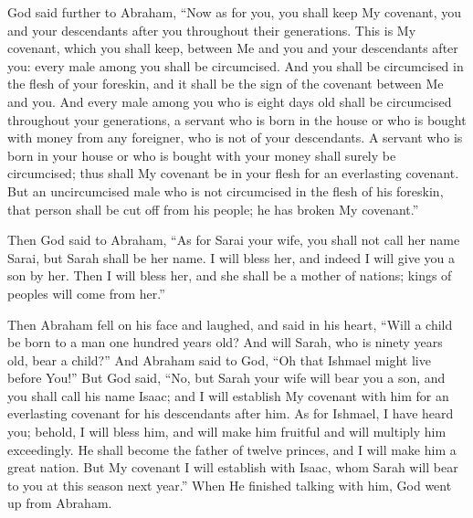 \begin{scripture}[Genesis 17:9-22]
    God said further to Abraham,  
     “Now as for you, you shall keep My covenant, you and your descendants after you throughout their generations.
    This is My covenant, which you shall keep, between Me and you and your descendants after you: every male among you shall be circumcised.
    And you shall be circumcised in the flesh of your foreskin, and it shall be the sign of the covenant between Me and you.
    And every male among you who is eight days old shall be circumcised throughout your generations, a servant who is born in the house or who is bought with money from any foreigner, who is not of your descendants.
    A servant who is born in your house or who is bought with your money shall surely be circumcised; thus shall My covenant be in your flesh for an everlasting covenant.
    But an uncircumcised male who is not circumcised in the flesh of his foreskin, that person shall be cut off from his people; he has broken My covenant.”

    \vspace{1\baselineskip}

    Then God said to Abraham, “As for Sarai your wife, you shall not call her name Sarai, but Sarah shall be her name. 
    I will bless her, and indeed I will give you a son by her. Then I will bless her, and she shall be a mother of nations; kings of peoples will come from her.”

    \vspace{1\baselineskip}

    Then Abraham fell on his face and laughed, 
    and said in his heart, “Will a child be born to a man one hundred years old? And will Sarah, who is ninety years old, bear a child?”
    And Abraham said to God, “Oh that Ishmael might live before You!”
    But God said, “No, but Sarah your wife will bear you a son, and you shall call his name Isaac; and I will establish My covenant with him for an everlasting covenant for his descendants after him.
    As for Ishmael, I have heard you; behold, I will bless him, and will make him fruitful and will multiply him exceedingly. He shall become the father of twelve princes, and I will make him a great nation.
    But My covenant I will establish with Isaac, whom Sarah will bear to you at this season next year.”
    When He finished talking with him, God went up from Abraham. 
\end{scripture}


